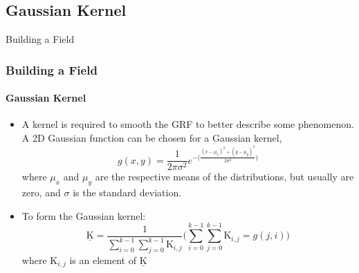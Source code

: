\documentclass[professionalfont,10pt]{beamer}
\begin{document}
	\subsection{Gaussian Kernel}
	\begin{frame}[t]{Building a Field}
		\frametitle{Building a Field}
		\framesubtitle{Gaussian Kernel}
		\hskip-0.75cm
		\begin{minipage}[t]{0.2\linewidth}\vspace{-0.5cm}
			\tiny\tableofcontents[currentsection,currentsubsection,hideothersubsections,subsectionstyle=show/shaded]
		\end{minipage}
		\hfill%
		\begin{minipage}[t]{0.86\linewidth}\vspace{-0.5cm}
			\begin{flushleft}
				\begin{itemize}
					\item A kernel is required to smooth the GRF to better describe some phenomenon. A 2D Gaussian function can be chosen for a Gaussian kernel,
					\begin{equation}
						g(x, y) = \frac{1}{2\pi\sigma^2}e^{-\Big(\frac{(x-\mu_x)^2 + (y-\mu_y)^2}{2\sigma^2}\Big)}
					\end{equation}
					where $\mu_x$ and $\mu_y$ are the respective means of the distributions, but usually are zero, and $\sigma$ is the standard deviation. \\
					\item To form the Gaussian kernel:
					\begin{equation}
					\underline{\text{K}} = \frac{1}{\sum_{i=0}^{k-1}\sum_{j=0}^{k-1} \text{K}_{i, j}}\Bigg(\sum_{i=0}^{k-1}\sum_{j=0}^{k-1} \text{K}_{i, j} = g(j, i)\Bigg)
					\end{equation}
					where $\text{K}_{i,j}$ is an element of $\underline{\text{K}}$
				\end{itemize}
			\end{flushleft}
		\end{minipage}
		\vfill%
	\end{frame}
\end{document}
